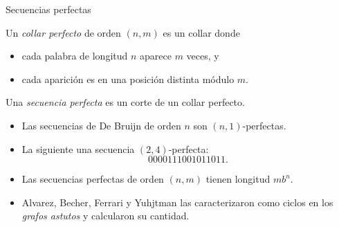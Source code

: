 \documentclass[spanish,xcolor={table}]{beamer}
\begin{document}

\begin{frame}{Secuencias perfectas}
  \begin{definition}
    Un \emph{collar perfecto} de orden $(n,m)$ es un collar donde
    \begin{itemize}
      \item cada palabra de longitud $n$ aparece $m$ veces, y
      \item cada aparición es en una posición distinta módulo $m$.
    \end{itemize}
    \medskip
    Una \emph{secuencia perfecta} es un corte de un collar perfecto.
  \end{definition}
  
  \begin{examples}
    \begin{itemize}
      \item Las secuencias de De Bruijn de orden $n$ son $(n,1)$-perfectas.
      \item La siguiente una secuencia $(2,4)$-perfecta: \vspace{-.5em}
      \[ 0000111001011011. \]
    \end{itemize}
  \end{examples}

  \begin{itemize}
    \item Las secuencias perfectas de orden $(n,m)$ tienen longitud $mb^n$.
    \item Alvarez, Becher, Ferrari y Yuhjtman las caracterizaron como ciclos
    en los \emph{grafos astutos} y calcularon su cantidad.
  \end{itemize}
  
\end{frame}

\end{document}
